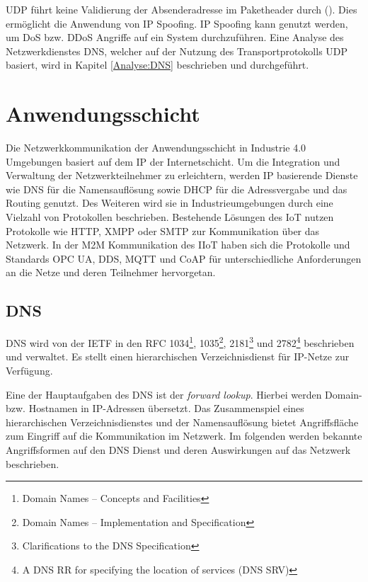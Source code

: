 \ac{UDP} führt keine Validierung der Absenderadresse im Paketheader durch (\cite{UDP2003}). Dies ermöglicht die Anwendung von \ac{IP} Spoofing. \ac{IP} Spoofing kann genutzt werden, um \ac{DoS} bzw. \ac{DDoS} Angriffe auf ein System durchzuführen. Eine Analyse des Netzwerkdienstes \ac{DNS}, welcher auf der Nutzung des Transportprotokolls \ac{UDP} basiert, wird in Kapitel \autoref{Analyse:DNS} beschrieben und durchgeführt.

\section{Anwendungsschicht}
\label{Analyse:Anwendungsschicht}
Die Netzwerkkommunikation der Anwendungsschicht in Industrie 4.0 Umgebungen basiert auf dem \ac{IP} der Internetschicht. Um die Integration und Verwaltung der Netzwerkteilnehmer zu erleichtern, werden \ac{IP} basierende Dienste wie \ac{DNS} für die Namensauflösung sowie \ac{DHCP} für die Adressvergabe und das Routing genutzt. Des Weiteren wird sie in Industrieumgebungen durch eine Vielzahl von Protokollen beschrieben. Bestehende Lösungen des \ac{IoT} nutzen Protokolle wie \ac{HTTP}, \ac{XMPP} oder \ac{SMTP} zur Kommunikation über das Netzwerk. In der \ac{M2M} Kommunikation des \ac{IIoT} haben sich die Protokolle und Standards \ac{OPC UA}, \ac{DDS}, \ac{MQTT} und \ac{CoAP} für unterschiedliche Anforderungen an die Netze und deren Teilnehmer hervorgetan. 

\subsection{\ac{DNS}}
\label{Analyse:DNS}
\ac{DNS} wird von der \ac{IETF} in den \ac{RFC} 1034\footnote{Domain Names – Concepts and Facilities}, 1035\footnote{Domain Names – Implementation and Specification}, 2181\footnote{Clarifications to the DNS Specification} und 2782\footnote{A DNS RR for specifying the location of services (DNS SRV)} beschrieben und verwaltet. Es stellt einen hierarchischen Verzeichnisdienst für \ac{IP}-Netze zur Verfügung. 

Eine der Hauptaufgaben des \ac{DNS} ist der \textit{forward lookup}. Hierbei werden Domain- bzw. Hostnamen in \ac{IP}-Adressen übersetzt. Das Zusammenspiel eines hierarchischen Verzeichnisdienstes und der Namensauflösung bietet Angriffsfläche zum Eingriff auf die Kommunikation im Netzwerk. Im folgenden werden bekannte Angriffsformen auf den \ac{DNS} Dienst und deren Auswirkungen auf das Netzwerk beschrieben.

